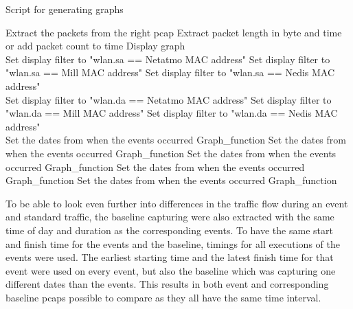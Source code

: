 \begin{algorithm}[H]
\caption{Script for generating graphs}\label{alg:GraphScript}
    \begin{algorithmic}[1]
         
            \State Extract the packets from the right pcap
                \State Extract packet length in byte and time or add packet count to time
                \State Display graph
            \EndFor
        \EndFor {}\\
         
                \State Set display filter to "wlan.sa == Netatmo \gls{MAC} address"
                \State Set display filter to "wlan.sa == Mill \gls{MAC} address"
                \State Set display filter to "wlan.sa == Nedis \gls{MAC} address"    
            \EndIf \\
         
                \State Set display filter to "wlan.da == Netatmo \gls{MAC} address"
                \State Set display filter to "wlan.da == Mill \gls{MAC} address"
                \State Set display filter to "wlan.da == Nedis \gls{MAC} address"  
            \EndIf
        \EndIf \\
         
            \State Set the dates from when the events occurred 
            \State Graph\_function
            \State Set the dates from when the events occurred 
            \State Graph\_function
            \State Set the dates from when the events occurred 
            \State Graph\_function
            \State Set the dates from when the events occurred 
            \State Graph\_function
            \State Set the dates from when the events occurred 
            \State Graph\_function
        \EndIf {}
    \end{algorithmic}
\end{algorithm}

To be able to look even further into differences in the traffic flow during an event and standard traffic, the baseline capturing were also extracted with the same time of day and duration as the corresponding events. To have the same start and finish time for the events and the baseline, timings for all executions of the events were used. The earliest starting time and the latest finish time for that event were used on every event, but also the baseline which was capturing one different dates than the events. This results in both event and corresponding baseline pcaps possible to compare as they all have the same time interval. 

